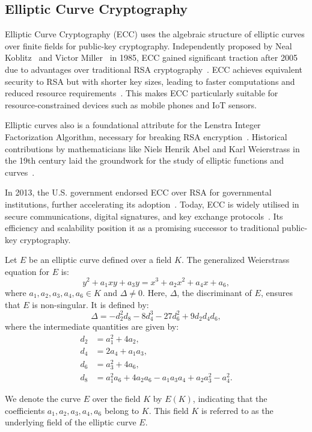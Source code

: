 \documentclass{iacrcc}
\begin{document}
\subsection{Elliptic Curve Cryptography}

Elliptic Curve Cryptography (ECC) uses the algebraic structure of elliptic curves over finite fields for public-key cryptography. Independently proposed by Neal Koblitz~\cite{Koblitz1987} and Victor Miller~\cite{C:Miller85} in 1985, ECC gained significant traction after 2005 due to advantages over traditional RSA cryptography~\cite{RivShaAdl78}. ECC achieves equivalent security to RSA but with shorter key sizes, leading to faster computations and reduced resource requirements~\cite{AC:Kaliski98}. This makes ECC particularly suitable for resource-constrained devices such as mobile phones and IoT sensors.

Elliptic curves also is a foundational attribute for the Lenstra Integer Factorization Algorithm, necessary for breaking RSA encryption~\cite{Lenstra1987}. Historical contributions by mathematicians like Niels Henrik Abel and Karl Weierstrass in the 19th century laid the groundwork for the study of elliptic functions and curves~\cite{Lang1978}.

In 2013, the U.S. government endorsed ECC over RSA for governmental institutions, further accelerating its adoption~\cite{}. Today, ECC is widely utilised in secure communications, digital signatures, and key exchange protocols~\cite{}. Its efficiency and scalability position it as a promising successor to traditional public-key cryptography.

Let \( E \) be an elliptic curve defined over a field \( K \). The generalized Weierstrass equation for \( E \) is:
\[
y^2 + a_1 xy + a_3 y = x^3 + a_2 x^2 + a_4 x + a_6,
\]
where \( a_1, a_2, a_3, a_4, a_6 \in K \) and \( \Delta \neq 0 \). Here, \( \Delta \), the discriminant of \( E \), ensures that \( E \) is non-singular. It is defined by:
\[
\Delta = -d_2^2 d_8 - 8d_4^3 - 27d_6^2 + 9d_2 d_4 d_6,
\]
where the intermediate quantities are given by:
\[
\begin{aligned}
d_2 &= a_1^2 + 4a_2, \\
d_4 &= 2a_4 + a_1 a_3, \\
d_6 &= a_3^2 + 4a_6, \\
d_8 &= a_1^2 a_6 + 4a_2 a_6 - a_1 a_3 a_4 + a_2 a_3^2 - a_4^2.
\end{aligned}
\]

We denote the curve \( E \) over the field \( K \) by \( E(K) \), indicating that the coefficients \( a_1, a_2, a_3, a_4, a_6 \) belong to \( K \). This field \( K \) is referred to as the underlying field of the elliptic curve \( E \).
\end{document}
